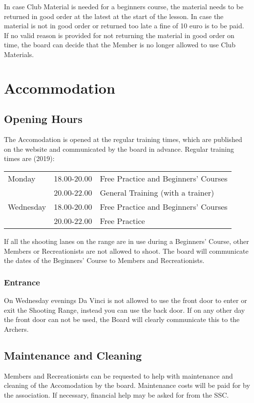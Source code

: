 \documentclass[a4paper]{article}
\begin{document}
In case Club Material is needed for a beginners course, the material needs to be returned in good order at the latest at the start of the lesson. In case the material is not in good order or returned too late a fine of 10 euro is to be paid. If no valid reason is provided for not returning the material in good order on time, the board can decide that the Member is no longer allowed to use Club Materials.

\section{Accommodation}
\subsection{Opening Hours}
\label{section:opening}
The Accomodation is opened at the regular training times, which are published on the website and communicated by the board in advance. Regular training times are {\g (2019)}: \\

\begin{tabular}{lll}
Monday    & 18.00-20.00 & Free Practice  and Beginners’ Courses \\
          & 20.00-22.00 & General Training (with a trainer)     \\
Wednesday & 18.00-20.00 & Free Practice and Beginners' Courses  \\
          & 20.00-22.00 & Free Practice                        
\end{tabular}

\bigskip

If all the shooting lanes on the range are in use during a Beginners’ Course, other Members or Recreationists are not allowed to shoot. The board will communicate the dates of the Beginners’ Course to Members and Recreationists.

\subsubsection{Entrance}
On Wednesday evenings Da Vinci is not allowed to use the front door to enter or exit the Shooting Range, instead you can use the back door. If on any other day the front door can not be used, the Board will clearly communicate this to the Archers. 

\subsection{Maintenance and Cleaning}
Members and Recreationists can be requested to help with maintenance and cleaning of the Accomodation by the board. Maintenance costs will be paid for by the association. If necessary, financial help may be asked for from the SSC.
\end{document}
